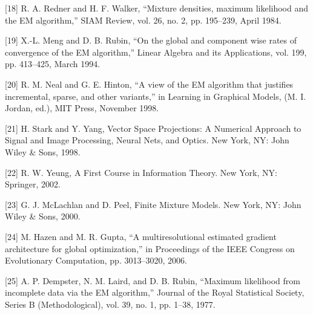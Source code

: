 \documentclass[onecolumn,12pt]{IEEEtran}
\begin{document}
[18] R. A. Redner and H. F. Walker, “Mixture densities, maximum likelihood and the EM algorithm,” SIAM Review, vol. 26, no. 2, pp. 195–239, April 1984.

[19] X.-L. Meng and D. B. Rubin, “On the global and component wise rates of convergence of the EM algorithm,” Linear Algebra and its Applications, vol. 199, pp. 413–425, March 1994.

[20] R. M. Neal and G. E. Hinton, “A view of the EM algorithm that justifies incremental, sparse, and other variants,” in Learning in Graphical Models, (M. I. Jordan, ed.), MIT Press, November 1998.

[21] H. Stark and Y. Yang, Vector Space Projections: A Numerical Approach to Signal and Image Processing, Neural Nets, and Optics. New York, NY: John Wiley \& Sons, 1998.

[22] R. W. Yeung, A First Course in Information Theory. New York, NY: Springer, 2002.

[23] G. J. McLachlan and D. Peel, Finite Mixture Models. New York, NY: John Wiley \& Sons, 2000.

[24] M. Hazen and M. R. Gupta, “A multiresolutional estimated gradient architecture for global optimization,” in Proceedings of the IEEE Congress on Evolutionary Computation, pp. 3013–3020, 2006.

[25] A. P. Dempster, N. M. Laird, and D. B. Rubin, “Maximum likelihood from incomplete data via the EM algorithm,” Journal of the Royal Statistical Society, Series B (Methodological), vol. 39, no. 1, pp. 1–38, 1977.
\end{document}
